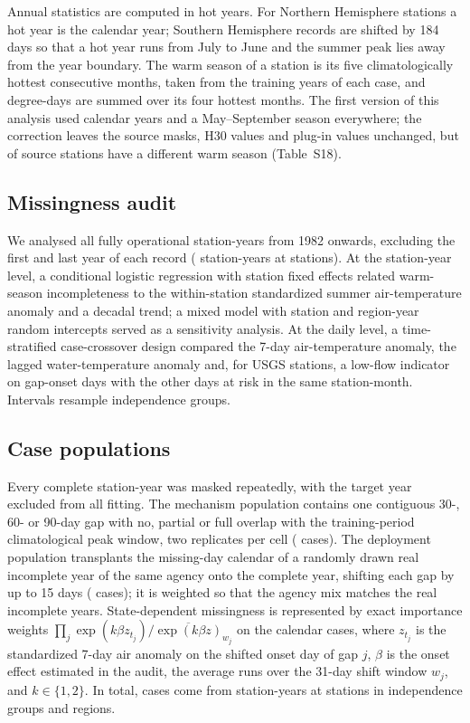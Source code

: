 \documentclass[draft]{agujournal2025}
\begin{document}
Annual statistics are computed in hot years. For Northern Hemisphere stations a hot year is the calendar year; Southern Hemisphere records are shifted by 184 days so that a hot year runs from July to June and the summer peak lies away from the year boundary. The warm season of a station is its five climatologically hottest consecutive months, taken from the training years of each case, and degree-days are summed over its four hottest months. The first version of this analysis used calendar years and a May--September season everywhere; the correction leaves the source masks, H30 values and plug-in values unchanged, but \TDefWarmNotMaySep{} of \TDefStations{} source stations have a different warm season (Table~S18).

\subsection{Missingness audit}
We analysed all fully operational station-years from 1982 onwards, excluding the first and last year of each record (\TEOneYears{} station-years at \TEOneStations{} stations). At the station-year level, a conditional logistic regression with station fixed effects related warm-season incompleteness to the within-station standardized summer air-temperature anomaly and a decadal trend; a mixed model with station and region-year random intercepts served as a sensitivity analysis. At the daily level, a time-stratified case-crossover design \cite{maclure1991,janes2005} compared the 7-day air-temperature anomaly, the lagged water-temperature anomaly and, for USGS stations, a low-flow indicator on gap-onset days with the other days at risk in the same station-month. Intervals resample independence groups.

\subsection{Case populations}
Every complete station-year was masked repeatedly, with the target year excluded from all fitting. The mechanism population contains one contiguous 30-, 60- or 90-day gap with no, partial or full overlap with the training-period climatological peak window, two replicates per cell (\TCrossedCases{} cases). The deployment population transplants the missing-day calendar of a randomly drawn real incomplete year of the same agency onto the complete year, shifting each gap by up to 15 days (\TCalendarCases{} cases); it is weighted so that the agency mix matches the real incomplete years. State-dependent missingness is represented by exact importance weights $\prod_j \exp(k\beta z_{t_j}) / \overline{\exp(k\beta z)}_{w_j}$ on the calendar cases, where $z_{t_j}$ is the standardized 7-day air anomaly on the shifted onset day of gap $j$, $\beta$ is the onset effect estimated in the audit, the average runs over the 31-day shift window $w_j$, and $k\in\{1,2\}$. In total, \TSourceCases{} cases come from \TSourceYears{} station-years at \TSourceStations{} stations in \TSourceGroups{} independence groups and \TSourceRegions{} regions.
\end{document}
